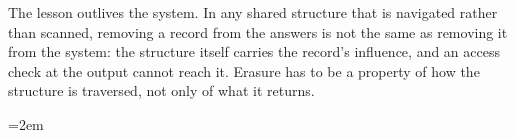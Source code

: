 \documentclass[sigconf, nonacm, review]{acmart}
\newif\ifextended\extendedtrue %
\begin{document}
The lesson outlives the system. In any shared structure that is navigated
rather than scanned, removing a record from the answers is not the same as
removing it from the system: the structure itself carries the record's
influence, and an access check at the output cannot reach it. Erasure has to
be a property of how the structure is traversed, not only of what it returns.





\ifextended
\clearpage
\appendix
\emergencystretch=2em %
\end{document}

